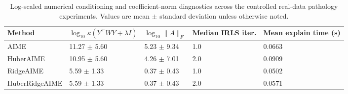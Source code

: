 \begin{table}
\caption{Log-scaled numerical conditioning and coefficient-norm diagnostics across the controlled real-data pathology experiments. Values are mean $\pm$ standard deviation unless otherwise noted.}
\label{tab:revision_log_conditioning_summary}
\begin{tabular}{lllll}
\toprule
Method & $\log_{10}\kappa(Y^\top W Y + \lambda I)$ & $\log_{10}\|A\|_F$ & Median IRLS iter. & Mean explain time (s) \\
\midrule
AIME & 11.27 $\pm$ 5.60 & 5.23 $\pm$ 9.34 & 1.0 & 0.0663 \\
HuberAIME & 10.95 $\pm$ 5.60 & 4.26 $\pm$ 7.01 & 2.0 & 0.0909 \\
RidgeAIME & 5.59 $\pm$ 1.33 & 0.37 $\pm$ 0.43 & 1.0 & 0.0502 \\
HuberRidgeAIME & 5.59 $\pm$ 1.33 & 0.37 $\pm$ 0.43 & 2.0 & 0.0571 \\
\bottomrule
\end{tabular}
\end{table}

